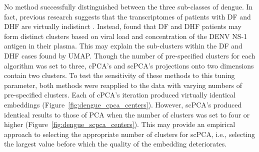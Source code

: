 No method successfully distinguished between the three sub-classes of dengue. In fact, previous research suggests that the transcriptomes of patients with DF and DHF are virtually indistinct \citep{Kwissa2014}. Instead, \citet{Kwissa2014} found that DF and DHF patients may form distinct clusters based on viral load and concentration of the DENV NS-1 antigen in their plasma. This may explain the sub-clusters within the DF and DHF cases found by UMAP. Though the number of pre-specified clusters for each algorithm was set to three, cPCA's and scPCA's projections onto two dimensions contain two clusters. To test the sensitivity of these methods to this tuning parameter, both methods were reapplied to the data with varying numbers of pre-specified clusters. Each of cPCA's iteration produced virtually identical embeddings (Figure~\ref{fig:dengue_cpca_centers}). However, scPCA's produced identical results to those of PCA when the number of clusters was set to four or higher (Figure~\ref{fig:dengue_scpca_centers}). This may provide an empirical approach to selecting the appropriate number of clusters for scPCA, i.e., selecting the largest value before which the quality of the embedding deteriorates.

